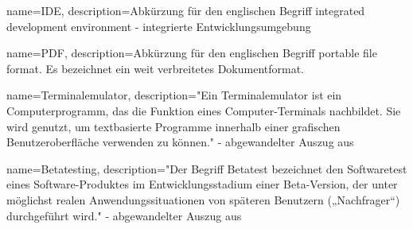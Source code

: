 {
    name=IDE,
    description={Abkürzung für den englischen Begriff integrated development
            environment - integrierte Entwicklungsumgebung}
}

{
    name=PDF,
    description={Abkürzung für den englischen Begriff portable file format. Es
            bezeichnet ein weit verbreitetes Dokumentformat.}
}

{
    name=Terminalemulator,
    description={"Ein Terminalemulator ist ein Computerprogramm, das die Funktion
            eines Computer-Terminals nachbildet. Sie wird genutzt, um textbasierte Programme
            innerhalb einer grafischen Benutzeroberfläche verwenden zu können." -
            abgewandelter Auszug aus \cite{terminal-emulator}}
}

{
    name=Betatesting,
    description={"Der Begriff Betatest bezeichnet den Softwaretest eines Software-Produktes
            im Entwicklungsstadium einer Beta-Version, der unter möglichst realen Anwendungssituationen
            von späteren Benutzern („Nachfrager“) durchgeführt wird." -
            abgewandelter Auszug aus \cite{beta-testing}}
}

\glsaddall